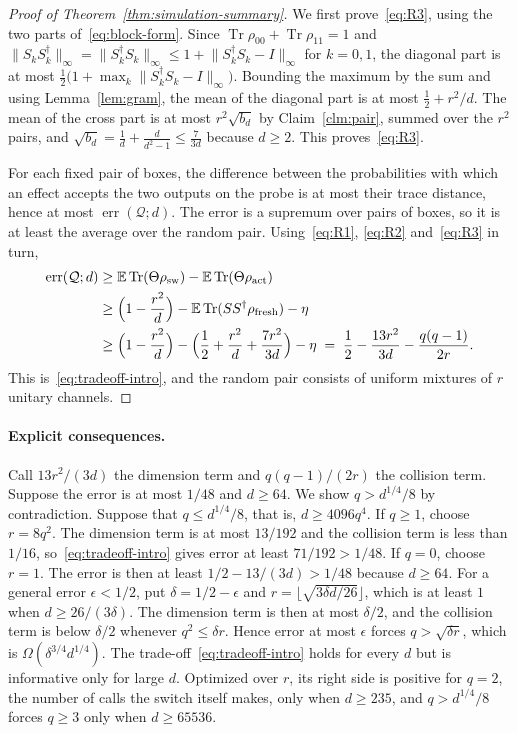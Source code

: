 \documentclass[11pt,letterpaper]{article}
\theoremstyle{definition}\newtheorem{definition}[theorem]{Definition}
\newcommand{\E}{\mathbb E}
\newcommand{\Tr}{\operatorname{Tr}}
\newcommand{\norm}[1]{\lVert#1\rVert}
\newcommand{\QC}{\mathcal Q}
\begin{document}
\begin{proof}[Proof of Theorem~\ref{thm:simulation-summary}]
We first prove~\eqref{eq:R3}, using the two
parts of~\eqref{eq:block-form}. Since $\Tr\rho_{00}+\Tr\rho_{11}=1$ and
$\norm{S_kS_k^\dagger}_\infty=\norm{S_k^\dagger S_k}_\infty
\le1+\norm{S_k^\dagger S_k-I}_\infty$ for $k=0,1$, the diagonal part is
at most $\frac12\bigl(1+\max_k\norm{S_k^\dagger S_k-I}_\infty\bigr)$. Bounding
the maximum by the sum and using Lemma~\ref{lem:gram}, the mean of the
diagonal part is at most $\frac12+r^2/d$. The mean of the cross part
is at most $r^2\sqrt{b_d}$ by Claim~\ref{clm:pair}, summed over the
$r^2$ pairs, and $\sqrt{b_d}=\frac1d+\frac d{d^2-1}\le\frac7{3d}$
because $d\ge2$. This proves~\eqref{eq:R3}.

For each fixed pair of boxes, the difference between the probabilities
with which an effect accepts the two outputs on the probe is at most
their trace distance, hence at most $\operatorname{err}(\QC;d)$. The
error is a supremum over pairs of boxes, so it is at least the average
over the random pair. Using~\eqref{eq:R1}, \eqref{eq:R2}
and~\eqref{eq:R3} in turn,
\begin{align*}
 \operatorname{err}(\QC;d)
 &\ge\E\Tr(\Theta\rho_{\mathrm{sw}})-\E\Tr(\Theta\rho_{\mathrm{act}})\\
 &\ge\Bigl(1-\frac{r^2}d\Bigr)-\E\Tr(SS^\dagger\rho_{\mathrm{fresh}})-\eta\\
 &\ge\Bigl(1-\frac{r^2}d\Bigr)-\Bigl(\frac12+\frac{r^2}d+\frac{7r^2}{3d}\Bigr)-\eta
 \;=\;\frac12-\frac{13r^2}{3d}-\frac{q(q-1)}{2r}.
\end{align*}
This is~\eqref{eq:tradeoff-intro}, and the random pair consists of
uniform mixtures of $r$ unitary channels.
\end{proof}



\paragraph{Explicit consequences.}
Call $13r^2/(3d)$ the dimension term and $q(q-1)/(2r)$ the collision
term. Suppose the error is at most $1/48$ and $d\ge64$. We show
$q>d^{1/4}/8$ by contradiction. Suppose that $q\le d^{1/4}/8$, that is,
$d\ge4096q^4$. If $q\ge1$, choose $r=8q^2$. The dimension term is at
most $13/192$ and the collision term is less than $1/16$,
so~\eqref{eq:tradeoff-intro} gives error at least $71/192>1/48$. If
$q=0$, choose $r=1$. The error is then at least $1/2-13/(3d)>1/48$
because $d\ge64$. For a general error $\epsilon<1/2$, put
$\delta=1/2-\epsilon$ and $r=\lfloor\sqrt{3\delta d/26}\rfloor$, which
is at least $1$ when $d\ge26/(3\delta)$. The dimension term is then at
most $\delta/2$, and the collision term is below $\delta/2$ whenever
$q^2\le\delta r$. Hence error at most $\epsilon$ forces
$q>\sqrt{\delta r}$, which is $\Omega(\delta^{3/4}d^{1/4})$.
The trade-off~\eqref{eq:tradeoff-intro} holds for every $d$ but is
informative only for large $d$. Optimized over $r$, its right side is
positive for $q=2$, the number of calls the switch itself makes,
only when $d\ge235$, and $q>d^{1/4}/8$ forces $q\ge3$ only when
$d\ge65536$.
\end{document}
